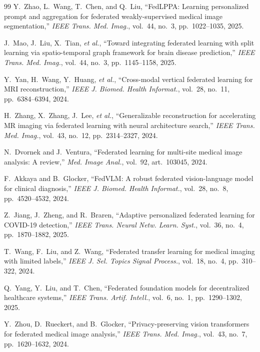 \documentclass[letterpaper, conference]{IEEEtran}
\begin{document}
\begin{thebibliography}{99}
Y.~Zhao, L.~Wang, T.~Chen, and Q.~Liu, ``FedLPPA: Learning personalized prompt and
aggregation for federated weakly-supervised medical image segmentation,''
\emph{IEEE Trans. Med. Imag.}, vol.~44, no.~3, pp.~1022--1035, 2025.

J.~Mao, J.~Liu, X.~Tian, \emph{et al.}, ``Toward integrating federated learning
with split learning via spatio-temporal graph framework for brain disease
prediction,'' \emph{IEEE Trans. Med. Imag.}, vol.~44, no.~3, pp.~1145--1158, 2025.

Y.~Yan, H.~Wang, Y.~Huang, \emph{et al.}, ``Cross-modal vertical federated learning
for MRI reconstruction,'' \emph{IEEE J. Biomed. Health Informat.}, vol.~28,
no.~11, pp.~6384--6394, 2024.

H.~Zhang, X.~Zhang, J.~Lee, \emph{et al.}, ``Generalizable reconstruction for
accelerating MR imaging via federated learning with neural architecture search,''
\emph{IEEE Trans. Med. Imag.}, vol.~43, no.~12, pp.~2314--2327, 2024.

N.~Dvornek and J.~Ventura, ``Federated learning for multi-site medical image
analysis: A review,'' \emph{Med. Image Anal.}, vol.~92, art.~103045, 2024.

F.~Akkaya and B.~Glocker, ``FedVLM: A robust federated vision-language model for
clinical diagnosis,'' \emph{IEEE J. Biomed. Health Informat.}, vol.~28, no.~8,
pp.~4520--4532, 2024.

Z.~Jiang, J.~Zheng, and R.~Braren, ``Adaptive personalized federated learning for
COVID-19 detection,'' \emph{IEEE Trans. Neural Netw. Learn. Syst.}, vol.~36,
no.~4, pp.~1870--1882, 2025.

T.~Wang, F.~Liu, and Z.~Wang, ``Federated transfer learning for medical imaging
with limited labels,'' \emph{IEEE J. Sel. Topics Signal Process.}, vol.~18,
no.~4, pp.~310--322, 2024.

Q.~Yang, Y.~Liu, and T.~Chen, ``Federated foundation models for decentralized
healthcare systems,'' \emph{IEEE Trans. Artif. Intell.}, vol.~6, no.~1,
pp.~1290--1302, 2025.

Y.~Zhou, D.~Rueckert, and B.~Glocker, ``Privacy-preserving vision transformers for
federated medical image analysis,'' \emph{IEEE Trans. Med. Imag.}, vol.~43,
no.~7, pp.~1620--1632, 2024.


\end{thebibliography}
\end{document}
